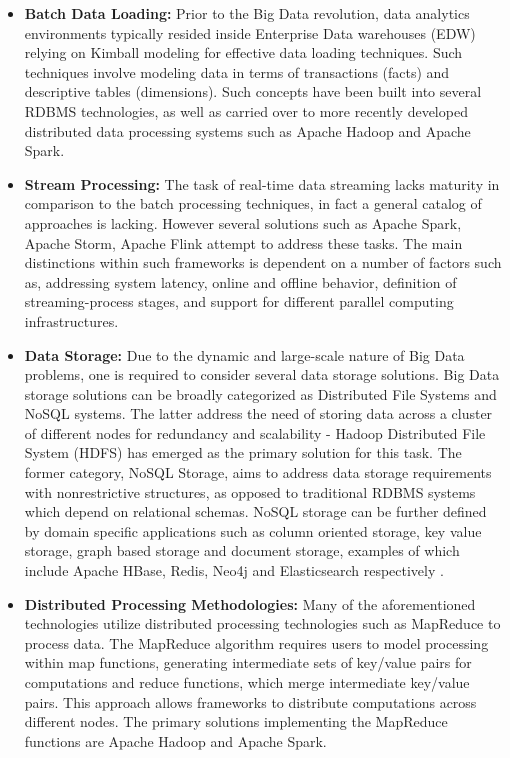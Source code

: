 \documentclass[10pt,journal,final,a4paper]{IEEEtran}
\begin{document}
\begin{itemize}
\item \textbf{Batch Data Loading:} Prior to the Big Data revolution, data analytics environments typically resided inside Enterprise Data warehouses (EDW) relying on Kimball modeling for effective data loading techniques\cite{kimball}. Such techniques involve modeling data in terms of transactions (facts) and descriptive tables (dimensions). Such concepts have been built into several RDBMS technologies, as well as carried over to more recently developed distributed data processing systems such as Apache Hadoop\cite{hdfs} and Apache Spark\cite{spark}\cite{spark_star}.
\item \textbf{Stream Processing:} The task of real-time data streaming lacks maturity in comparison to the batch processing techniques, in fact a general catalog of approaches is lacking. However several solutions such as Apache Spark\cite{spark}, Apache Storm\cite{storm}, Apache Flink\cite{flink} attempt to address these tasks. The main distinctions within such frameworks is dependent on a number of factors such as, addressing system latency, online and offline behavior, definition of streaming-process stages, and support for different parallel computing infrastructures\cite{bigdata_realtime}. 
\item \textbf{Data Storage:} Due to the dynamic and large-scale nature of Big Data problems, one is required to consider several data storage solutions. Big Data storage solutions can be broadly categorized as Distributed File Systems and NoSQL systems. The latter address the need of storing data across a cluster of different nodes for redundancy and scalability - Hadoop Distributed File System (HDFS)\cite{hdfs} has emerged as the primary solution for this task. The former category, NoSQL Storage, aims to address data storage requirements with nonrestrictive structures, as opposed to traditional RDBMS systems which depend on relational schemas. NoSQL storage can be further defined by domain specific applications such as column oriented storage, key value storage, graph based storage and document storage, examples of which include Apache HBase\cite{hbase}, Redis\cite{redis}, Neo4j\cite{neo4j} and Elasticsearch\cite{elastic} respectively \cite{bigdata_nosql}.
\item \textbf{Distributed Processing Methodologies:} Many of the aforementioned technologies utilize distributed processing technologies such as MapReduce\cite{mapreduce} to process data. The MapReduce algorithm requires users to model processing within map functions, generating intermediate sets of key/value pairs for computations and reduce functions, which merge intermediate key/value pairs. This approach allows frameworks to distribute computations across different nodes. The primary solutions implementing the MapReduce functions are Apache Hadoop and Apache Spark.
\end{itemize}
\end{document}
